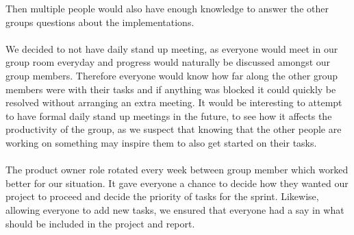 Then multiple people would also have enough knowledge to answer the other groups questions about the implementations.
\\\\
We decided to not have daily stand up meeting, as everyone would meet in our group room everyday and progress would naturally be discussed amongst our group members.
Therefore everyone would know how far along the other group members were with their tasks and if anything was blocked it could quickly be resolved without arranging an extra meeting.
It would be interesting to attempt to have formal daily stand up meetings in the future, to see how it affects the productivity of the group, as we suspect that knowing that the other people are working on something may inspire them to also get started on their tasks.
\\\\
The product owner role rotated every week between group member which worked better for our situation. 
It gave everyone a chance to decide how they wanted our project to proceed and decide the priority of tasks for the sprint.
Likewise, allowing everyone to add new tasks, we ensured that everyone had a say in what should be included in the project and report.
